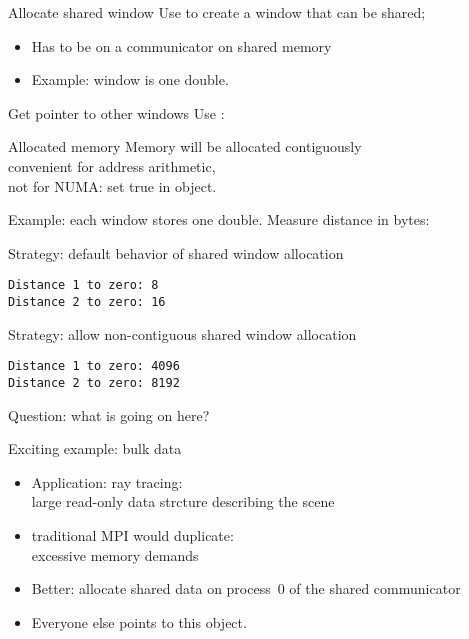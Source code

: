 \begin{exerciseframe}
  
\end{exerciseframe}

\begin{numberedframe}{Allocate shared window}
Use  to create a window that can
be shared;
\begin{itemize}
\item Has to be on a communicator on shared memory
\item Example: window is one double.
\end{itemize}
\end{numberedframe}

\begin{numberedframe}{Get pointer to other windows}
  Use :
\end{numberedframe}


\begin{numberedframe}{Allocated memory}
  Memory will be allocated contiguously\\
  convenient for address arithmetic,\\ not for NUMA:
  set  true in
   object.  

  Example: each window stores one double. Measure distance in bytes:
  \begin{multicols}{2}
    Strategy: default behavior of shared window allocation
\begin{verbatim}
Distance 1 to zero: 8
Distance 2 to zero: 16
\end{verbatim}
\columnbreak
Strategy: allow non-contiguous shared window allocation
\begin{verbatim}
Distance 1 to zero: 4096
Distance 2 to zero: 8192
\end{verbatim}
  \end{multicols}
Question: what is going on here?
\end{numberedframe}

\begin{numberedframe}{Exciting example: bulk data}
  \begin{itemize}
  \item Application: ray tracing:\\
    large read-only data strcture describing the scene
  \item traditional MPI would duplicate:\\
    excessive memory demands
  \item Better: allocate shared data on process~0 of the shared communicator
  \item Everyone else points to this object.
  \end{itemize}
\end{numberedframe}

\endinput

\begin{numberedframe}{}
\begin{lstlisting}
  
\end{lstlisting}
\end{numberedframe}

